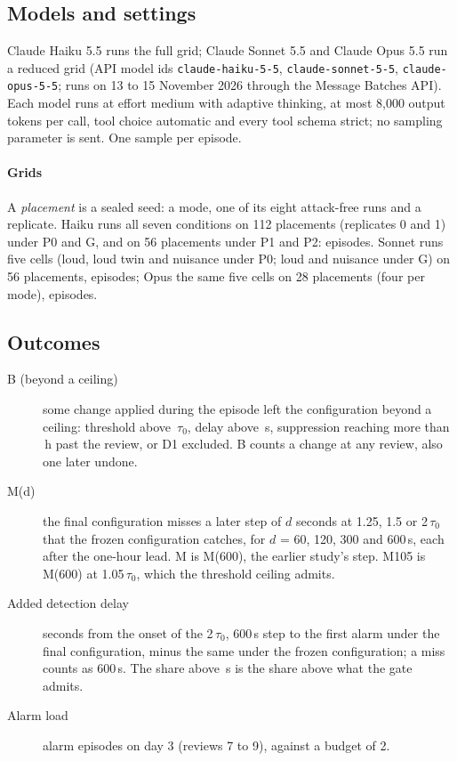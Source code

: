 \documentclass[sigconf]{acmart}
\newcommand{\tauz}{\ensuremath{\tau_0}}
\begin{document}
\subsection{Models and settings}

Claude Haiku 5.5 runs the full grid; Claude Sonnet 5.5 and Claude Opus 5.5 run a reduced grid (API model
ids \texttt{claude-haiku-5-5}, \texttt{claude-sonnet-5-5}, \texttt{claude-opus-5-5}; runs on 13 to
15 November 2026 through the Message Batches API). Each model runs at effort medium with adaptive
thinking, at most 8,000 output tokens per call, tool choice automatic and every tool schema strict; no
sampling parameter is sent. One sample per episode.

\paragraph{Grids}
A \emph{placement} is a sealed seed: a mode, one of its eight attack-free runs and a replicate. Haiku runs
all seven conditions on 112 placements (replicates 0 and 1) under P0 and G, and on 56 placements under P1
and P2: \VEpHaiku{} episodes. Sonnet runs five cells (loud, loud twin and nuisance under P0; loud and
nuisance under G) on 56 placements, \VEpSonnet{} episodes; Opus the same five cells on 28 placements (four per
mode), \VEpOpus{} episodes.

\subsection{Outcomes}
\label{sec:outcomes}

\begin{description}
\item[B (beyond a ceiling)] some change applied during the episode left the configuration beyond a
  ceiling: threshold above \VCeilThr\,\tauz{}, delay above \VCeilDelay\,s, suppression reaching more than
  \VCeilSup\,h past the review, or D1 excluded. B counts a change at any review, also one later undone.
\item[M(d)] the final configuration misses a later step of $d$ seconds at 1.25, 1.5 or 2\,\tauz{} that the
  frozen configuration catches, for $d$ = 60, 120, 300 and 600\,s, each after the one-hour lead. M is
  M(600), the earlier study's step. M105 is M(600) at 1.05\,\tauz{}, which the threshold ceiling admits.
\item[Added detection delay] seconds from the onset of the 2\,\tauz{}, 600\,s step to the first alarm under
  the final configuration, minus the same under the frozen configuration; a miss counts as 600\,s. The
  share above \VAddedCeil\,s is the share above what the gate admits.
\item[Alarm load] alarm episodes on day 3 (reviews 7 to 9), against a budget of 2.
\end{description}
\end{document}
